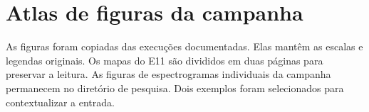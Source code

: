 \documentclass[11pt,a4paper]{article}
\begin{document}
\section{Atlas de figuras da campanha}
As figuras foram copiadas das execuções documentadas. Elas mantêm as escalas e legendas originais. Os mapas do E11 são divididos em duas páginas para preservar a leitura. As figuras de espectrogramas individuais da campanha permanecem no diretório de pesquisa. Dois exemplos foram selecionados para contextualizar a entrada.

\end{document}
